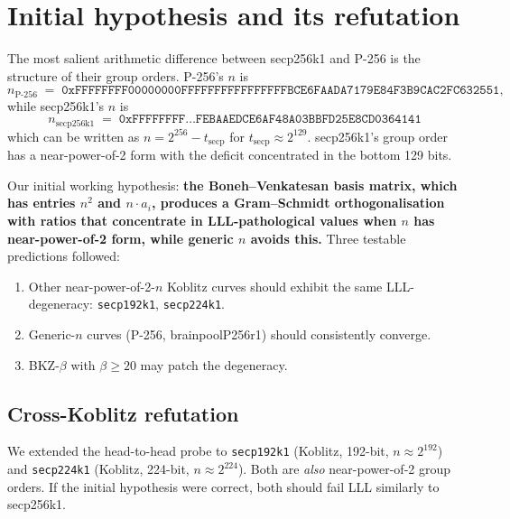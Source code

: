 \documentclass[10pt,a4paper]{article}
\begin{document}
\section{Initial hypothesis and its refutation}

The most salient arithmetic difference between secp256k1 and
P-256 is the structure of their group orders. P-256's $n$ is
\[
n_{\text{P-256}} \;=\; \texttt{0xFFFFFFFF00000000FFFFFFFFFFFFFFFFBCE6FAADA7179E84F3B9CAC2FC632551},
\]
while secp256k1's $n$ is
\[
n_{\text{secp256k1}} \;=\; \texttt{0xFFFFFFFF\ldots FEBAAEDCE6AF48A03BBFD25E8CD0364141}
\]
which can be written as $n = 2^{256} - t_{\text{secp}}$ for
$t_{\text{secp}} \approx 2^{129}$. secp256k1's group order has a
near-power-of-2 form with the deficit concentrated in the bottom
129 bits.

Our initial working hypothesis: \textbf{the Boneh--Venkatesan basis
matrix, which has entries $n^2$ and $n \cdot a_i$, produces a
Gram--Schmidt orthogonalisation with ratios that concentrate in
LLL-pathological values when $n$ has near-power-of-2 form, while
generic $n$ avoids this.} Three testable predictions followed:

\begin{enumerate}
\item Other near-power-of-2-$n$ Koblitz curves should exhibit the
      same LLL-degeneracy: \texttt{secp192k1}, \texttt{secp224k1}.
\item Generic-$n$ curves (P-256, brainpoolP256r1) should
      consistently converge.
\item BKZ-$\beta$ with $\beta \geq 20$ may patch the degeneracy.
\end{enumerate}

\subsection{Cross-Koblitz refutation}

We extended the head-to-head probe to \texttt{secp192k1} (Koblitz,
192-bit, $n \approx 2^{192}$) and \texttt{secp224k1} (Koblitz,
224-bit, $n \approx 2^{224}$). Both are
\emph{also} near-power-of-2 group orders. If the initial hypothesis
were correct, both should fail LLL similarly to secp256k1.
\end{document}
